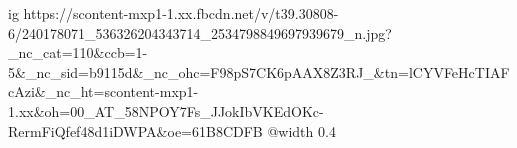  
 
 
 
 

\ifcmt
  ig https://scontent-mxp1-1.xx.fbcdn.net/v/t39.30808-6/240178071_536326204343714_2534798849697939679_n.jpg?_nc_cat=110&ccb=1-5&_nc_sid=b9115d&_nc_ohc=F98pS7CK6pAAX8Z3RJ_&tn=lCYVFeHcTIAFcAzi&_nc_ht=scontent-mxp1-1.xx&oh=00_AT_58NPOY7Fs_JJokIbVKEdOKc-RermFiQfef48d1iDWPA&oe=61B8CDFB
  @width 0.4
\fi
